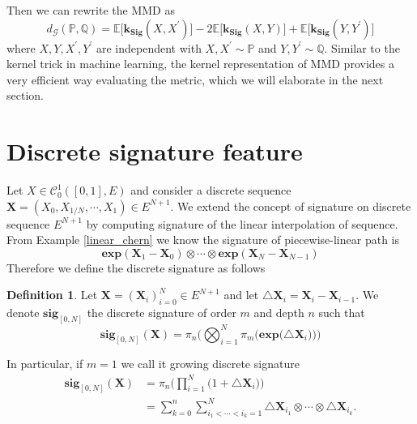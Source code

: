 \documentclass[12pt]{report}
\theoremstyle{definition}
\newtheorem{definition}[theorem]{Definition}
\theoremstyle{remark}
\newcommand{\E}{\mathbb{E}}
\renewcommand{\P}{\mathbb{P}}
\begin{document}
Then we can rewrite the MMD as 
\begin{equation}
   d_{\mathcal{G}}(\P,\mathbb{Q}) = \E\big[\mathbf{k_{Sig}}(X,X^{\prime})\big] - 2\E\big[\mathbf{k_{Sig}}(X,Y)\big] + \E\big[\mathbf{k_{Sig}}(Y,Y^{\prime})\big]
\end{equation}
where $X,Y,X^{\prime},Y^{\prime}$ are independent with $X,X^{\prime}\sim\P$ and $Y,Y^{\prime}\sim\mathbb{Q}$. Similar to the kernel trick in machine learning, the kernel representation of MMD provides a very efficient way evaluating the metric, which we will elaborate in the next section.  





\section{Discrete signature feature}
Let $X \in \mathcal{C}^{1}_{0}([0,1],E)$ and consider a discrete sequence $\mathbf{X} = (X_{0},X_{1/N},\cdots, X_{1}) \in E^{N+1}$. We extend the concept of signature on discrete sequence $E^{N+1}$ by computing signature of the linear interpolation of sequence. From Example \ref{linear_chern} we know the signature of piecewise-linear path is 
\begin{equation}
  \mathbf{exp}(\mathbf{X}_{1} - \mathbf{X}_{0}) \otimes \cdots \otimes \mathbf{exp}(\mathbf{X}_{N} - \mathbf{X}_{N-1})
\end{equation}
Therefore we define the discrete signature as follows 
\begin{definition}
  Let $\mathbf{X} = (\mathbf{X}_{i})_{i=0}^{N} \in E^{N+1}$ and let $\triangle \mathbf{X}_{i} = \mathbf{X}_{i} - \mathbf{X}_{i-1}$. We denote $\mathbf{sig}_{[0,N]}$ the discrete signature of order $m$ and depth $n$ such that 
  \begin{equation}
    \mathbf{sig}_{[0,N]}(\mathbf{X}) = \pi_{n}\bigg(\bigotimes_{i=1}^{N}\pi_{m}\Big(\mathbf{exp}\big(\triangle \mathbf{X}_{i}\big)\Big)\bigg)
  \end{equation} 
\end{definition}
In particular, if $m = 1$ we call it growing discrete signature
  \begin{equation}
    \begin{split}
      \mathbf{sig}_{[0,N]}(\mathbf{X}) &= \pi_{n}\bigg(\prod_{i=1}^{N}\big(1 + \triangle \mathbf{X}_{i}\big)\bigg)\\
      &= \sum_{k=0}^{n}\sum_{i_{1} < \cdots < i_{k} = 1}^{N} \triangle \mathbf{X}_{i_{1}} \otimes \cdots \otimes \triangle \mathbf{X}_{i_{k}}.
    \end{split}
  \end{equation} 
\end{document}
